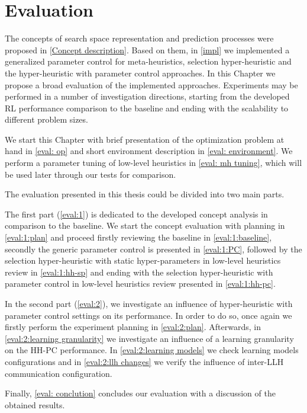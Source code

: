 \chapter{Evaluation}\label{eval}
The concepts of search space representation and prediction processes were proposed in \cref{Concept description}. Based on them, in \cref{impl} we implemented a generalized parameter control for meta-heuristics, selection hyper-heuristic and the hyper-heuristic with parameter control approaches. In this Chapter we propose a broad evaluation of the implemented approaches. Experiments may be performed in a number of investigation directions, starting from the developed RL performance comparison to the baseline and ending with the scalability to different problem sizes.

We start this Chapter with brief presentation of the optimization problem at hand in \cref{eval: op} and short environment description in \cref{eval: environment}. We perform a parameter tuning of low-level heuristics in \cref{eval: mh tuning}, which will be used later through our tests for comparison. 

The evaluation presented in this thesis could be divided into two main parts.

The first part (\cref{eval:1}) is dedicated to the developed concept analysis in comparison to the baseline. We start the concept evaluation with planning in \cref{eval:1:plan} and proceed firstly reviewing the baseline in \cref{eval:1:baseline}, secondly the generic parameter control is presented in \cref{eval:1:PC}, followed by the selection hyper-heuristic with static hyper-parameters in low-level heuristics review in \cref{eval:1:hh-sp} and ending with the selection hyper-heuristic with parameter control in low-level heuristics review presented in \cref{eval:1:hh-pc}.

In the second part (\cref{eval:2}), we investigate an influence of hyper-heuristic with parameter control settings on its performance. In order to do so, once again we firstly perform the experiment planning in \cref{eval:2:plan}. Afterwards, in \cref{eval:2:learning granularity} we investigate an influence of a learning granularity on the HH-PC performance. In \cref{eval:2:learning models} we check learning models configurations and in \cref{eval:2:llh changes} we verify the influence of inter-LLH communication configuration.

Finally, \cref{eval: conclution} concludes our evaluation with a discussion of the obtained results.


